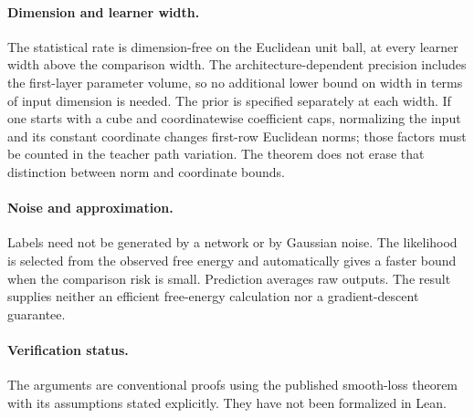 \paragraph{Dimension and learner width.}
The statistical rate is dimension-free on the Euclidean unit ball, at every learner width above the comparison width. The architecture-dependent precision includes the first-layer parameter volume, so no additional lower bound on width in terms of input dimension is needed. The prior is specified separately at each width. If one starts with a cube and coordinatewise coefficient caps, normalizing the input and its constant coordinate changes first-row Euclidean norms; those factors must be counted in the teacher path variation. The theorem does not erase that distinction between norm and coordinate bounds.

\paragraph{Noise and approximation.}
Labels need not be generated by a network or by Gaussian noise. The likelihood is selected from the observed free energy and automatically gives a faster bound when the comparison risk is small. Prediction averages raw outputs. The result supplies neither an efficient free-energy calculation nor a gradient-descent guarantee.

\paragraph{Verification status.}
The arguments are conventional proofs using the published smooth-loss theorem with its assumptions stated explicitly. They have not been formalized in Lean.
